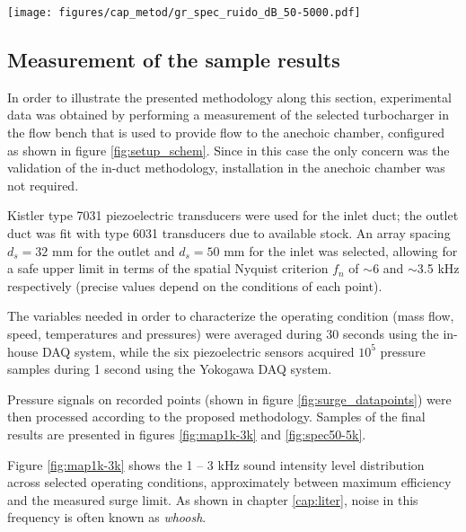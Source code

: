 \begin{figure*}[t!]
\centering
\texttt{[image: figures/cap\_metod/gr\_spec\_ruido\_dB\_50-5000.pdf]}
\caption[Sample of spectrograms following the 160 krpm line]{Sample of spectrograms calculated using the procedure outlined in subsection \ref{sub:noise_maps_and_spectrograms}, following the 160 krpm paths marked in figure \ref{fig:map1k-3k}. The 1--3 kHz band selected for the maps in figure \ref{fig:map1k-3k} is highlighted, along with some particular flow phenomena discussed in section \ref{sec:sample_meas}.}
\label{fig:spec50-5k}
\end{figure*}

\subsection{Measurement of the sample results}
\label{sec:sample_meas}

In order to illustrate the presented methodology along this section, experimental data was obtained by performing a measurement of the selected turbocharger in the flow bench that is used to provide flow to the anechoic chamber, configured as shown in figure \ref{fig:setup_schem}. Since in this case the only concern was the validation of the in-duct methodology, installation in the anechoic chamber was not required. 

Kistler type 7031 piezoelectric transducers were used for the inlet duct; the outlet duct was fit with type 6031 transducers due to available stock. An array spacing $d_s=32$ mm for the outlet and $d_s=50$ mm for the inlet was selected, allowing for a safe upper limit in terms of the spatial Nyquist criterion $f_n$ of $\sim$6 and $\sim$3.5 kHz respectively (precise values depend on the conditions of each point).

The variables needed in order to characterize the operating condition (mass flow, speed, temperatures and pressures) were averaged during 30 seconds using the in-house DAQ system, while the six piezoelectric sensors acquired $10^5$ pressure samples during 1 second using the Yokogawa DAQ system.

Pressure signals on recorded points (shown in figure \ref{fig:surge_datapoints}) were then processed according to the proposed methodology. Samples of the final results are presented in figures \ref{fig:map1k-3k} and \ref{fig:spec50-5k}.

Figure \ref{fig:map1k-3k} shows the 1 -- 3 kHz sound intensity level distribution across selected operating conditions, approximately between maximum efficiency and the measured surge limit. As shown in chapter \ref{cap:liter}, noise in this frequency is often known as \emph{whoosh}.

